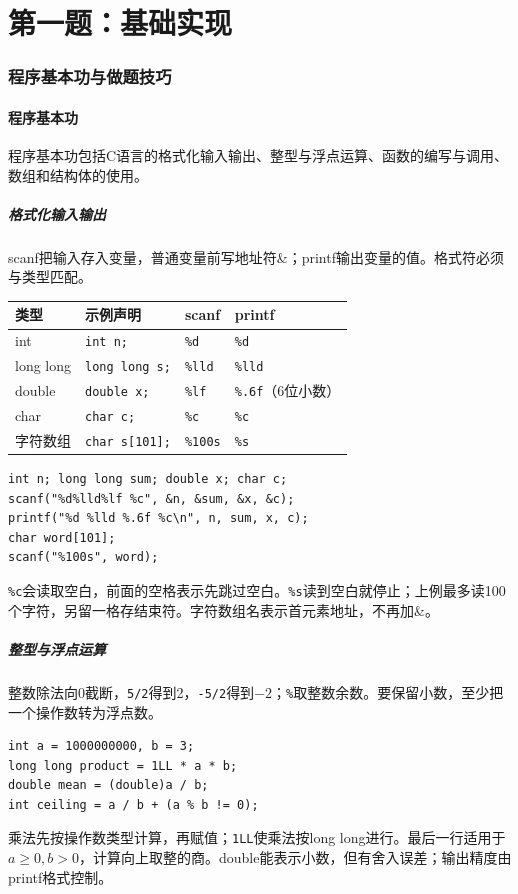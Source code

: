 \clearpage
\part{第一题：基础实现}
\section{程序基本功与做题技巧}
\subsection{程序基本功}
程序基本功包括C语言的格式化输入输出、整型与浮点运算、函数的编写与调用、数组和结构体的使用。
\subsubsection{格式化输入输出}
scanf把输入存入变量，普通变量前写地址符\&；printf输出变量的值。格式符必须与类型匹配。
\begin{center}
\begin{tabular}{llll}
\toprule 类型 & 示例声明 & scanf & printf\\\midrule
int & \texttt{int n;} & \texttt{\%d} & \texttt{\%d}\\
long long & \texttt{long long s;} & \texttt{\%lld} & \texttt{\%lld}\\
double & \texttt{double x;} & \texttt{\%lf} & \texttt{\%.6f}（6位小数）\\
char & \texttt{char c;} & \texttt{\%c} & \texttt{\%c}\\
字符数组 & \texttt{char s[101];} & \texttt{\%100s} & \texttt{\%s}\\
\bottomrule
\end{tabular}
\end{center}
\begin{lstlisting}
int n; long long sum; double x; char c;
scanf("%d%lld%lf %c", &n, &sum, &x, &c);
printf("%d %lld %.6f %c\n", n, sum, x, c);
char word[101];
scanf("%100s", word);
\end{lstlisting}
\texttt{\%c}会读取空白，前面的空格表示先跳过空白。\texttt{\%s}读到空白就停止；上例最多读100个字符，另留一格存结束符。字符数组名表示首元素地址，不再加\&。
\subsubsection{整型与浮点运算}
整数除法向0截断，\texttt{5/2}得到2，\texttt{-5/2}得到$-2$；\texttt{\%}取整数余数。要保留小数，至少把一个操作数转为浮点数。
\begin{lstlisting}
int a = 1000000000, b = 3;
long long product = 1LL * a * b;
double mean = (double)a / b;
int ceiling = a / b + (a % b != 0);
\end{lstlisting}
乘法先按操作数类型计算，再赋值；\texttt{1LL}使乘法按long long进行。最后一行适用于$a\ge0,b>0$，计算向上取整的商。double能表示小数，但有舍入误差；输出精度由printf格式控制。
